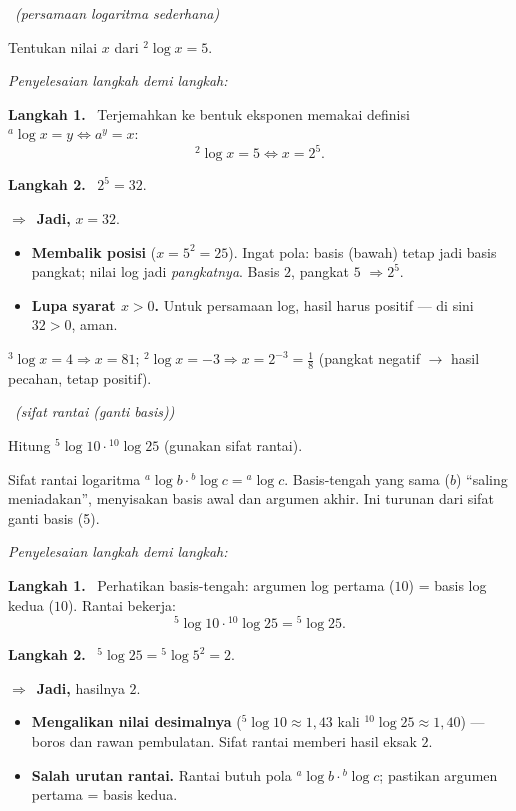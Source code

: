 \documentclass[11pt,a4paper]{report}
\theoremstyle{gaya}
\newcommand{\jawab}{\par\smallskip\noindent\textit{\textcolor{oranye}{Penyelesaian langkah demi langkah:}}\par\smallskip}
\newcommand{\langkah}[1]{\par\smallskip\noindent\textbf{\textcolor{biru}{Langkah #1.}}\ }
\newcommand{\jadi}{\par\smallskip\noindent$\Rightarrow$\ \textbf{Jadi, }}
\newcommand{\soalno}[2]{%
  \par\bigskip
  \noindent{\large\bfseries\color{ungu}\rule[-2pt]{4pt}{14pt}\ Soal #1}%
  \ {\normalfont\itshape\color{gray}(#2)}\par\nopagebreak\smallskip}
\begin{document}
\soalno{1.3.5}{persamaan logaritma sederhana}
\begin{soalbox}{}
Tentukan nilai $x$ dari ${}^{2}\!\log x = 5$.
\end{soalbox}

\jawab
\langkah{1} Terjemahkan ke bentuk eksponen memakai definisi
${}^{a}\!\log x=y\iff a^y=x$:
\[
{}^{2}\!\log x = 5 \iff x = 2^{5}.
\]
\langkah{2} $2^5=32$.
\jadi $x=32$.

\begin{jebakan}
\begin{itemize}[leftmargin=*,topsep=2pt]
  \item \textbf{Membalik posisi} ($x=5^2=25$). Ingat pola: basis (bawah) tetap
  jadi basis pangkat; nilai log jadi \emph{pangkatnya}. Basis $2$, pangkat $5$
  $\Rightarrow 2^5$.
  \item \textbf{Lupa syarat $x>0$.} Untuk persamaan log, hasil harus positif ---
  di sini $32>0$, aman.
\end{itemize}
\end{jebakan}

\begin{variasi}
${}^{3}\!\log x=4\Rightarrow x=81$; ${}^{2}\!\log x=-3\Rightarrow x=2^{-3}=\tfrac18$
(pangkat negatif $\to$ hasil pecahan, tetap positif).
\end{variasi}

\soalno{1.3.6}{sifat rantai (ganti basis)}
\begin{soalbox}{}
Hitung ${}^{5}\!\log 10 \cdot {}^{10}\!\log 25$ (gunakan sifat rantai).
\end{soalbox}

\begin{ingat}{Sifat rantai logaritma}
${}^{a}\!\log b \cdot {}^{b}\!\log c = {}^{a}\!\log c$. Basis-tengah yang sama
($b$) ``saling meniadakan'', menyisakan basis awal dan argumen akhir. Ini
turunan dari sifat ganti basis (5).
\end{ingat}

\jawab
\langkah{1} Perhatikan basis-tengah: argumen log pertama ($10$) = basis log kedua
($10$). Rantai bekerja:
\[
{}^{5}\!\log 10 \cdot {}^{10}\!\log 25 = {}^{5}\!\log 25.
\]
\langkah{2} ${}^{5}\!\log25 = {}^{5}\!\log5^2 = 2$.
\jadi hasilnya $2$.

\begin{jebakan}
\begin{itemize}[leftmargin=*,topsep=2pt]
  \item \textbf{Mengalikan nilai desimalnya} (${}^5\!\log10\approx1{,}43$ kali
  ${}^{10}\!\log25\approx1{,}40$) --- boros dan rawan pembulatan. Sifat rantai
  memberi hasil eksak $2$.
  \item \textbf{Salah urutan rantai.} Rantai butuh pola
  ${}^{a}\!\log b\cdot{}^{b}\!\log c$; pastikan argumen pertama = basis kedua.
\end{itemize}
\end{jebakan}
\end{document}

